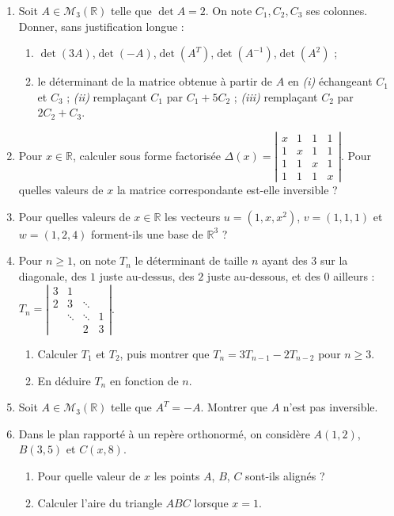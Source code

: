 \documentclass[a4paper,11pt]{article}
\newcommand{\R}{\mathbb{R}}\newcommand{\C}{\mathbb{C}}\newcommand{\K}{\mathbb{K}}
\newcommand{\dt}[1]{\left|\begin{matrix}#1\end{matrix}\right|}
\begin{document}
\begin{enumerate}
\item Soit $A\in\mathcal M_3(\R)$ telle que $\det A=2$. On note $C_1,C_2,C_3$ ses colonnes. Donner, sans justification longue :
  \begin{enumerate}
  \item $\det(3A)$,\quad $\det(-A)$,\quad $\det(A^T)$,\quad $\det(A^{-1})$,\quad $\det(A^2)$ ;
  \item le déterminant de la matrice obtenue à partir de $A$ en \emph{(i)} échangeant $C_1$ et $C_3$ ;
        \emph{(ii)} remplaçant $C_1$ par $C_1+5C_2$ ; \emph{(iii)} remplaçant $C_2$ par $2C_2+C_3$.
  \end{enumerate}
\item Pour $x\in\R$, calculer sous forme factorisée
      $\Delta(x)=\dt{x&1&1&1\\1&x&1&1\\1&1&x&1\\1&1&1&x}$. Pour quelles valeurs de $x$ la matrice correspondante est-elle inversible ?
\item Pour quelles valeurs de $x\in\R$ les vecteurs $u=(1,x,x^2)$, $v=(1,1,1)$ et $w=(1,2,4)$ forment-ils une base de $\R^3$ ?
\item Pour $n\geq1$, on note $T_n$ le déterminant de taille $n$ ayant des $3$ sur la diagonale, des $1$ juste au-dessus, des
      $2$ juste au-dessous, et des $0$ ailleurs :
      $T_n=\dt{3&1&&\\2&3&\ddots&\\&\ddots&\ddots&1\\&&2&3}$.
  \begin{enumerate}
  \item Calculer $T_1$ et $T_2$, puis montrer que $T_n=3T_{n-1}-2T_{n-2}$ pour $n\geq3$.
  \item En déduire $T_n$ en fonction de $n$.
  \end{enumerate}
\item Soit $A\in\mathcal M_3(\R)$ telle que $A^T=-A$. Montrer que $A$ n'est pas inversible.
\item Dans le plan rapporté à un repère orthonormé, on considère $A(1,2)$, $B(3,5)$ et $C(x,8)$.
  \begin{enumerate}
  \item Pour quelle valeur de $x$ les points $A$, $B$, $C$ sont-ils alignés ?
  \item Calculer l'aire du triangle $ABC$ lorsque $x=1$.
  \end{enumerate}
\end{enumerate}
\end{document}
